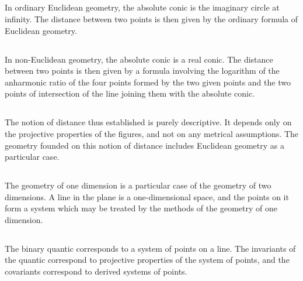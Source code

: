 \documentclass[11pt,a4paper]{book}
\begin{document}
\begin{center}
\subsection{}

In ordinary Euclidean geometry, the absolute conic is the imaginary circle at infinity. The distance between two points is then given by the ordinary formula of Euclidean geometry.

\subsection{}

In non-Euclidean geometry, the absolute conic is a real conic. The distance between two points is then given by a formula involving the logarithm of the anharmonic ratio of the four points formed by the two given points and the two points of intersection of the line joining them with the absolute conic.

\subsection{}

The notion of distance thus established is purely descriptive. It depends only on the projective properties of the figures, and not on any metrical assumptions. The geometry founded on this notion of distance includes Euclidean geometry as a particular case.

\subsection{}

The geometry of one dimension is a particular case of the geometry of two dimensions. A line in the plane is a one-dimensional space, and the points on it form a system which may be treated by the methods of the geometry of one dimension.

\subsection{}

The binary quantic corresponds to a system of points on a line. The invariants of the quantic correspond to projective properties of the system of points, and the covariants correspond to derived systems of points.

\subsection{}


\end{center}
\end{document}
